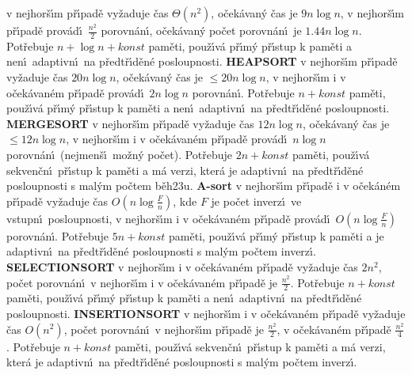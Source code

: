  v nejhor\v s\'\i m p\v r\'\i pad\v e vy\v zaduje \v cas 
$\Theta (n^2)$, o\v ce\-k\'avan\'y \v cas je $9n\log n$, v 
nej\-hor\v s\'\i m p\v r\'\i pad\v e prov\'ad\'\i\ $\frac {n^2}2$ porov\-n\'an\'\i ,  
o\v cek\'avan\'y po\v cet porov\-n\'an\'\i\ je $1.44n\log n$. 
Pot\v rebuje $n+\log n+konst$ pam\v eti, pou\v z\'\i v\'a p\v r\'\i m\'y 
p\v r\'\i stup k pam\v eti a nen\'\i\ adaptivn\'\i\ na p\v redt\v r\'\i d\v en\'e 
posloupnosti.\newline 
{\bf HEAPSORT} v nejhor\v s\'\i m p\v r\'\i pad\v e vy\v zaduje \v cas $
20n\log n$, 
o\v ce\-k\'avan\'y \v cas je $\le 20n\log n$, v nejhor\v s\'\i m i v 
o\v cek\'avan\'em p\v r\'\i pad\v e prov\'ad\'\i\ $2n\log n$ porovn\'an\'\i . 
Pot\v rebuje $n+konst$ pam\v eti, pou\v z\'\i v\'a p\v r\'\i m\'y p\v r\'\i stup k pam\v eti a 
nen\'\i\ adaptivn\'\i\ na p\v redt\v r\'\i d\v en\'e posloupnosti.\newline 
{\bf MERGESORT} v nejhor\v s\'\i m p\v r\'\i pad\v e vy\v zaduje \v cas 
$12n\log n$, o\v cek\'avan\'y \v cas je $\le 12n\log n$, v nejhor\v s\'\i m 
i v o\v cek\'ava\-n\'em p\v r\'\i pad\v e prov\'ad\'\i\ $n\log n$ 
porovn\'an\'\i\ (nejmen\v s\'\i\ mo\v zn\'y po\v cet). Pot\v rebuje $
2n+konst$ 
pam\v eti, pou\v z\'\i v\'a 
sekven\v cn\'\i\ p\v r\'\i stup k pam\v eti a m\'a verzi, kter\'a je 
adaptivn\'\i\ na p\v redt\v r\'\i d\v en\'e posloupnosti s mal\'ym po\v ctem 
b\v eh\accent23u.\newline 
{\bf A-sort} v nejhor\v s\'\i m p\v r\'\i pad\v e i v o\v cek\'an\'em p\v r\'\i pad\v e vy\v zaduje \v cas 
$O(n\log\frac Fn)$, kde $F$ je po\v cet inverz\'\i\ ve vstupn\'\i\ 
posloupnosti,  v nejhor\v s\'\i m i v o\v cek\'avan\'em 
p\v r\'\i pad\v e prov\'ad\'\i\ $O(n\log\frac Fn)$ porovn\'an\'\i . Pot\v rebuje  
$5n+konst$ pam\v eti, pou\v z\'\i v\'a p\v r\'\i m\'y p\v r\'\i stup k pam\v eti 
a je adaptivn\'\i\ na p\v redt\v r\'\i d\v en\'e posloupnosti s mal\'ym 
po\v ctem inverz\'\i .\newline 
{\bf SELECTIONSORT} v nejhor\v s\'\i m i v o\v cek\'avan\'em p\v r\'\i pad\v e 
vy\v zaduje \v cas $2n^2$, po\v cet porov\-n\'an\'\i\ v nejhor\v s\'\i m 
i v o\v cek\'avan\'em p\v r\'\i pad\v e je $\frac {n^2}2$. Pot\v rebuje 
$n+konst$ pam\v eti, pou\v z\'\i v\'a p\v r\'\i m\'y p\v r\'\i stup k pam\v eti a 
nen\'\i\ adaptivn\'\i\ na p\v redt\v r\'\i d\v en\'e posloupnosti.\newline 
{\bf INSERTIONSORT} v nejhor\v s\'\i m i v o\v cek\'avan\'em p\v r\'\i pad\v e  
vy\-\v zaduje \v cas $O(n^2)$, po\v cet porov\-n\'an\'\i\ v nejhor\v s\'\i m 
p\v r\'\i pad\v e je $\frac {n^2}2$, v o\v ce\-k\'a\-van\'em p\v r\'\i pad\v e 
$\frac {n^2}4$. Pot\v rebuje $n+konst$ pam\v eti, pou\v z\'\i\-v\'a 
sekven\v cn\'\i\ p\v r\'\i stup k pam\v eti a m\'a verzi, kter\'a je 
adaptivn\'\i\ na p\v redt\v r\'\i d\v en\'e posloupnosti s mal\'ym po\v ctem 
inverz\'\i .
\medskip

